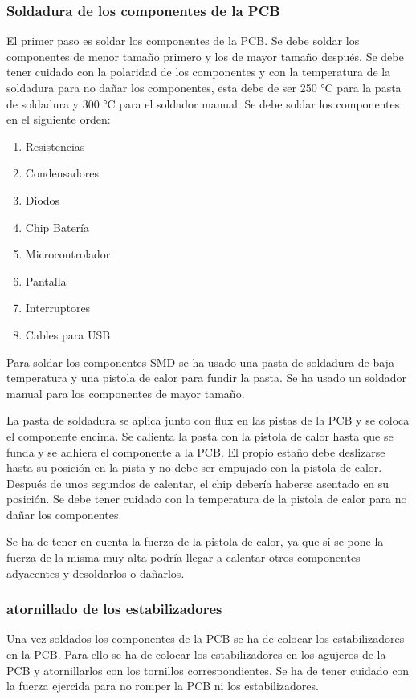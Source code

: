 \subsubsection{Soldadura de los componentes de la \gls{PCB}}
El primer paso es soldar los componentes de la \gls{PCB}. Se debe soldar los componentes de menor tamaño primero y los de mayor tamaño después. Se debe tener cuidado con la polaridad de los componentes y con la temperatura de la soldadura para no dañar los componentes, esta debe de ser 250 °C para la pasta de soldadura y 300 °C para el soldador manual. Se debe soldar los componentes en el siguiente orden:

\begin{enumerate}
    \item Resistencias
    \item Condensadores
    \item Diodos
    \item Chip Batería
    \item Microcontrolador
    \item Pantalla
    \item Interruptores
    \item Cables para \gls{USB}
\end{enumerate}

Para soldar los componentes \gls{SMD} se ha usado una pasta de soldadura de baja temperatura y una pistola de calor para fundir la pasta. Se ha usado un soldador manual para los componentes de mayor tamaño.

La pasta de soldadura se aplica junto con flux en las pistas de la \gls{PCB} y se coloca el componente encima. Se calienta la pasta con la pistola de calor hasta que se funda y se adhiera el componente a la \gls{PCB}. El propio estaño debe deslizarse hasta su posición en la pista y no debe ser empujado con la pistola de calor. Después de unos segundos de calentar, el chip debería haberse asentado en su posición. Se debe tener cuidado con la temperatura de la pistola de calor para no dañar los componentes.

Se ha de tener en cuenta la fuerza de la pistola de calor, ya que sí se pone la fuerza de la misma muy alta podría llegar a calentar otros componentes adyacentes y desoldarlos o dañarlos. \cite{SoldaduraSMD}

\subsubsection{atornillado de los estabilizadores}
Una vez soldados los componentes de la \gls{PCB} se ha de colocar los estabilizadores en la \gls{PCB}. Para ello se ha de colocar los estabilizadores en los agujeros de la \gls{PCB} y atornillarlos con los tornillos correspondientes. Se ha de tener cuidado con la fuerza ejercida para no romper la \gls{PCB} ni los estabilizadores.

